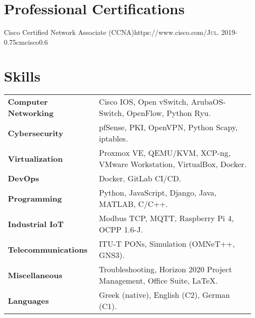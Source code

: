 \documentclass{mycv}
\begin{document}
	\vspace*{0.5cm}	


	\vspace*{0.5cm}
		
	\section{Professional Certifications}
	\begin{EntryDatedLogo}{Cisco Certified Network Associate (CCNA)}{https://www.cisco.com/}{\scshape{Jul. 2019}}{}{-0.75cm}{cisco}{0.6}
	\end{EntryDatedLogo}
	
	\section{Skills}
	\begin{tabular}{m{4.5cm} m{13cm}}\renewcommand{\arraystretch}{2}
		\textbf{Computer Networking}   	& Cisco IOS, Open vSwitch, ArubaOS-Switch, OpenFlow, Python Ryu.\\
		\textbf{Cybersecurity}			& pfSense, PKI, OpenVPN, Python Scapy, iptables. \\
		\textbf{Virtualization}			& Proxmox VE, QEMU/KVM, XCP-ng, VMware Workstation, VirtualBox, Docker.\\ 
		\textbf{DevOps}					& Docker, GitLab CI/CD. \\
		\textbf{Programming} 	    	& Python, JavaScript, Django, Java, MATLAB, C/C++. \\
		\textbf{Industrial IoT}			& Modbus TCP, MQTT, Raspberry Pi 4, OCPP 1.6-J.\\
		\textbf{Telecommunications}   	& ITU-T PONs, Simulation (OMNeT++, GNS3). \\
		\textbf{Miscellaneous}			& Troubleshooting, Horizon 2020 Project Management, Office Suite, \LaTeX. \\
		\textbf{Languages} 				& Greek (native), English (C2), German (C1).
	\end{tabular}
\end{document}
